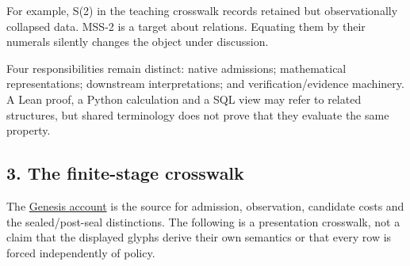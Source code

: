 \documentclass[
  11pt,
]{article}
\begin{document}
For example, S(2) in the teaching crosswalk records retained but
observationally collapsed data. MSS-2 is a target about relations.
Equating them by their numerals silently changes the object under
discussion.

Four responsibilities remain distinct: native admissions; mathematical
representations; downstream interpretations; and verification/evidence
machinery. A Lean proof, a Python calculation and a SQL view may refer
to related structures, but shared terminology does not prove that they
evaluate the same property.

\subsection{3. The finite-stage
crosswalk}\label{the-finite-stage-crosswalk}

The
\href{../../../../../omega_engine_education/documentation/001_genesis/genesis.md}{Genesis
account} is the source for admission, observation, candidate costs and
the sealed/post-seal distinctions. The following is a presentation
crosswalk, not a claim that the displayed glyphs derive their own
semantics or that every row is forced independently of policy.
\end{document}
